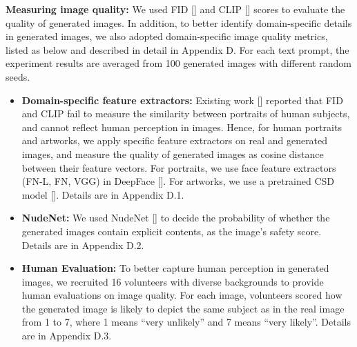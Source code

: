 \documentclass{article}
\begin{document}
\noindent\textbf{Measuring image quality:} We used FID [] and CLIP [] scores to evaluate the quality of generated images. In addition, to better identify domain-specific details in generated images, we also adopted domain-specific image quality metrics, listed as below and described in detail in Appendix D. For each text prompt, the experiment results are averaged from 100 generated images with different random seeds.
\begin{itemize}
	\item \textbf{Domain-specific feature extractors:} Existing work [] reported that FID and CLIP fail to measure the similarity between portraits of human subjects, and cannot reflect human perception in images. Hence, for human portraits and artworks, we apply specific feature extractors on real and generated images, and measure the quality of generated images as cosine distance between their feature vectors. For portraits, we use face feature extractors (FN-L, FN, VGG) in DeepFace []. For artworks, we use a pretrained CSD model []. Details are in Appendix D.1.
	\item \textbf{NudeNet:} We used NudeNet [] to decide the probability of whether the generated images contain explicit contents, as the image's safety score. Details are in Appendix D.2.
	\item \textbf{Human Evaluation:} To better capture human perception in generated images, we recruited 16 volunteers with diverse backgrounds to provide human evaluations on image quality. For each image, volunteers scored how the generated image is likely to depict the same subject as in the real image from 1 to 7, where 1 means ``very unlikely'' and 7 means ``very likely''. Details are in Appendix D.3.
\end{itemize}
\end{document}
